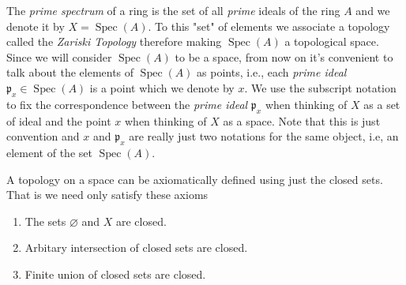 \documentclass[]{report}
\DeclareMathOperator\Spec{Spec}
\begin{document}
The \textit{prime spectrum} of a ring is the set of all \textit{prime} ideals of the ring $A$ and we denote it by $X = \Spec(A)$. To this "set" of elements we associate a topology called the \textit{Zariski Topology} therefore making $\Spec(A)$ a topological space. Since we will consider $\Spec(A)$ to be a space, from now on it's convenient to talk about the elements of $\Spec(A)$ as points, i.e., each \textit{prime ideal} $\mathfrak{p}_x \in \Spec(A)$ is a point which we denote by $x$. We use the subscript notation to fix the correspondence between the \textit{prime ideal} $\mathfrak{p}_x$ when thinking of $X$ as a set of ideal and the point $x$ when thinking of $X$ as a space. Note that this is just convention and $x$ and $\mathfrak{p}_x$ are really just two notations for the same object, i.e, an element of the set $\Spec(A)$.

A topology on a space can be axiomatically defined using just the closed sets. That is we need only satisfy these axioms
\begin{enumerate}
    \item The sets $\varnothing$ and $X$ are closed. 
    \item Arbitary intersection of closed sets are closed. 
    \item Finite union of closed sets are closed.
\end{enumerate}
\end{document}
